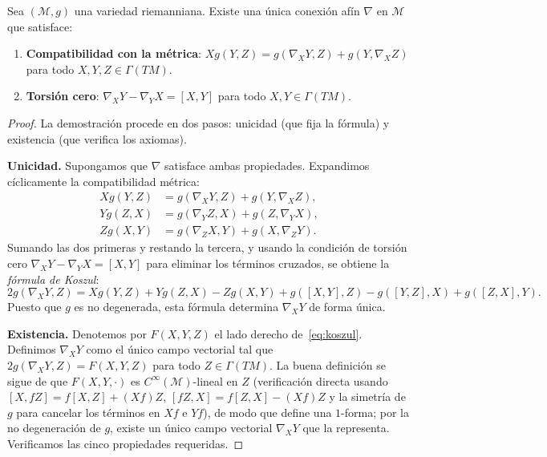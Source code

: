\begin{theorem}\label{thm:existencia_levi_civita}
Sea $(\mathcal{M}, g)$ una variedad riemanniana. Existe una única conexión afín $\nabla$ en $\mathcal{M}$ que satisface:
\begin{enumerate}
	\item \textbf{Compatibilidad con la métrica}: $Xg(Y,Z) = g(\nabla_X Y, Z) + g(Y, \nabla_X Z)$ para todo $X, Y, Z \in \Gamma(TM)$.
	\item \textbf{Torsión cero}: $\nabla_X Y - \nabla_Y X = [X,Y]$ para todo $X, Y \in \Gamma(TM)$.
\end{enumerate}
\end{theorem}

\begin{proof}
La demostración procede en dos pasos: unicidad (que fija la fórmula) y existencia (que verifica los axiomas).

\textbf{Unicidad.} Supongamos que $\nabla$ satisface ambas propiedades. Expandimos cíclicamente la compatibilidad métrica:
\begin{align*}
Xg(Y,Z) &= g(\nabla_X Y, Z) + g(Y, \nabla_X Z), \\
Yg(Z,X) &= g(\nabla_Y Z, X) + g(Z, \nabla_Y X), \\
Zg(X,Y) &= g(\nabla_Z X, Y) + g(X, \nabla_Z Y).
\end{align*}
Sumando las dos primeras y restando la tercera, y usando la condición de torsión cero $\nabla_X Y - \nabla_Y X = [X,Y]$ para eliminar los términos cruzados, se obtiene la \textit{fórmula de Koszul}:
\begin{equation}\label{eq:koszul}
2g(\nabla_X Y, Z) = Xg(Y,Z) + Yg(Z,X) - Zg(X,Y) + g([X,Y],Z) - g([Y,Z],X) + g([Z,X],Y).
\end{equation}
Puesto que $g$ es no degenerada, esta fórmula determina $\nabla_X Y$ de forma única.

\textbf{Existencia.} Denotemos por $F(X,Y,Z)$ el lado derecho de~\eqref{eq:koszul}. Definimos $\nabla_X Y$ como el único campo vectorial tal que $2g(\nabla_X Y, Z) = F(X,Y,Z)$ para todo $Z \in \Gamma(TM)$. La buena definición se sigue de que $F(X,Y,\cdot)$ es $C^\infty(\mathcal{M})$-lineal en $Z$ (verificación directa usando $[X, fZ] = f[X,Z] + (Xf)Z$, $[fZ, X] = f[Z,X] - (Xf)Z$ y la simetría de $g$ para cancelar los términos en $Xf$ e $Yf$), de modo que define una $1$-forma; por la no degeneración de $g$, existe un único campo vectorial $\nabla_X Y$ que la representa. Verificamos las cinco propiedades requeridas.


\end{proof}
